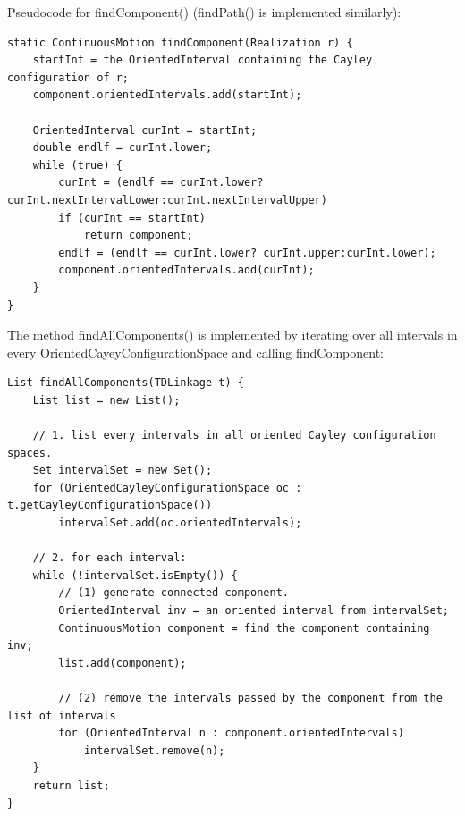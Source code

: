 \documentclass[10pt]{article}
\begin{document}
\smallskip
 Pseudocode for \textsf{findComponent()} (\textsf{findPath()} is implemented similarly):
\begin{lstlisting}
static ContinuousMotion findComponent(Realization r) {
	startInt = the OrientedInterval containing the Cayley configuration of r;
	component.orientedIntervals.add(startInt);

	OrientedInterval curInt = startInt; 
	double endlf = curInt.lower;
	while (true) {
		curInt = (endlf == curInt.lower? curInt.nextIntervalLower:curInt.nextIntervalUpper)
		if (curInt == startInt) 
			return component;	
		endlf = (endlf == curInt.lower? curInt.upper:curInt.lower);
		component.orientedIntervals.add(curInt);
	}
}
\end{lstlisting}

The method  \textsf{findAllComponents()} is implemented by iterating over all intervals 
in every \textsf{OrientedCayeyConfigurationSpace} and 
calling \textsf{findComponent}:

\begin{lstlisting}
List findAllComponents(TDLinkage t) {
	List list = new List();

	// 1. list every intervals in all oriented Cayley configuration spaces.
	Set intervalSet = new Set();
	for (OrientedCayleyConfigurationSpace oc : t.getCayleyConfigurationSpace()) 
		intervalSet.add(oc.orientedIntervals);

	// 2. for each interval:
	while (!intervalSet.isEmpty()) {
		// (1) generate connected component.
		OrientedInterval inv = an oriented interval from intervalSet;
		ContinuousMotion component = find the component containing inv;
		list.add(component);

		// (2) remove the intervals passed by the component from the list of intervals
		for (OrientedInterval n : component.orientedIntervals) 
			intervalSet.remove(n);
	}
	return list;
}
\end{lstlisting}


%
%
%
\end{document}
